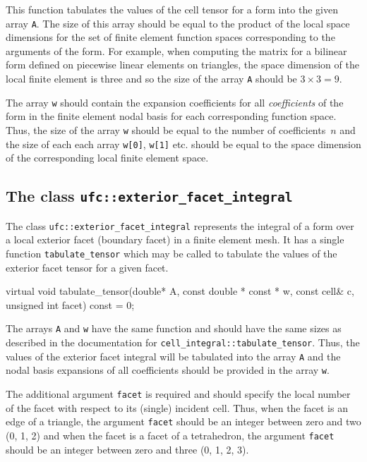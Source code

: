 This function tabulates the values of the cell tensor for a form into
the given array \texttt{A}. The size of this array should be equal to
the product of the local space dimensions for the set of finite
element function spaces corresponding to the arguments of the
form. For example, when computing the matrix for a bilinear form
defined on piecewise linear elements on triangles, the space dimension
of the local finite element is three and so the size of the array
\texttt{A} should be $3 \times 3 = 9$.

The array \texttt{w} should contain the expansion coefficients for all
\emph{coefficients} of the form in the finite element nodal basis for
each corresponding function space. Thus, the size of the array
\texttt{w} should be equal to the number of coefficients~$n$ and the
size of each each array \texttt{w[0]}, \texttt{w[1]} etc. should be
equal to the space dimension of the corresponding local finite element
space.

\subsection{The class \texttt{ufc::exterior\_facet\_integral}}

The class \texttt{ufc::exterior\_facet\_integral} represents the
integral of a form over a local exterior facet (boundary facet) in a
finite element mesh. It has a single function
\texttt{tabulate\_tensor} which may be called to tabulate the values
of the exterior facet tensor for a given facet.

\begin{code}
virtual void tabulate_tensor(double* A,
                             const double * const * w,
                             const cell& c,
                             unsigned int facet) const = 0;
\end{code}

The arrays \texttt{A} and \texttt{w} have the same function and should
have the same sizes as described in the documentation for
\texttt{cell\_integral::tabulate\_tensor}. Thus, the values of the
exterior facet integral will be tabulated into the array \texttt{A}
and the nodal basis expansions of all coefficients should be provided
in the array \texttt{w}.

The additional argument \texttt{facet} is required and should specify
the local number of the facet with respect to its (single) incident
cell. Thus, when the facet is an edge of a triangle, the argument
\texttt{facet} should be an integer between zero and two (0, 1, 2) and
when the facet is a facet of a tetrahedron, the argument
\texttt{facet} should be an integer between zero and three (0, 1, 2,
3).

